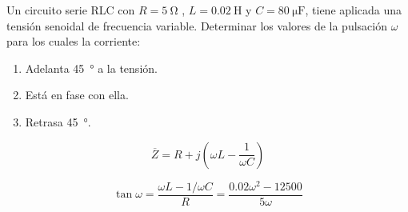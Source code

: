 \documentclass[12pt]{article}
\begin{document}




Un circuito serie RLC con $R = \SI{5}{\ohm}$ , $L = \SI{0.02}{\henry}$ y $C=\SI{80}{\micro\farad}$, tiene aplicada una tensión senoidal de frecuencia variable. Determinar los valores de la pulsación $\omega$ para los cuales la corriente:
\begin{enumerate}
\item Adelanta \SI{45}{\degree} a la tensión.
\item Está en fase con ella.
\item Retrasa \SI{45}{\degree}.
\end{enumerate}

\begin{equation*}
  \overline{Z} = R + j (\omega L - \frac{1}{\omega C})
\end{equation*}

\begin{equation*}
  \tan \omega = \frac{\omega L - 1/\omega C}{R} = \frac{0.02\omega^2 - 12500}{5\omega}
\end{equation*}
\end{document}
